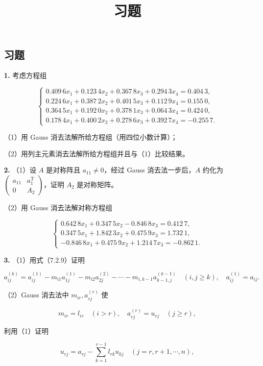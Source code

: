 \documentclass[
  10pt,
  fontset=fandol]{ctexart}
\title{习题}
\author{}
\date{}
\begin{document}
\maketitle

\subsection{习题}\label{ux4e60ux9898}

\textbf{1.} 考虑方程组

\[
\begin{cases}
0.409\,6x_1+0.123\,4x_2+0.367\,8x_3+0.294\,3x_4=0.404\,3,\\
0.224\,6x_1+0.387\,2x_2+0.401\,5x_3+0.112\,9x_4=0.155\,0,\\
0.364\,5x_1+0.192\,0x_2+0.378\,1x_3+0.064\,3x_4=0.424\,0,\\
0.178\,4x_1+0.400\,2x_2+0.278\,6x_3+0.392\,7x_4=-0.255\,7.
\end{cases}
\]

（1）用 Gauss 消去法解所给方程组（用四位小数计算）；

（2）用列主元素消去法解所给方程组并且与（1）比较结果。

\textbf{2.} （1）设 \(A\) 是对称阵且 \(a_{11}\neq0\)，经过 Gauss 消去法一步后，\(A\) 约化为 \(\begin{pmatrix}a_{11}&a_1^{\mathrm T}\\0&A_2\end{pmatrix}\)，证明 \(A_2\) 是对称矩阵。

（2）用 Gauss 消去法解对称方程组

\[
\begin{cases}
0.642\,8x_1+0.347\,5x_2-0.846\,8x_3=0.412\,7,\\
0.347\,5x_1+1.842\,3x_2+0.475\,9x_3=1.732\,1,\\
-0.846\,8x_1+0.475\,9x_2+1.214\,7x_3=-0.862\,1.
\end{cases}
\]

\textbf{3.} （1）用式（7.2.9）证明

\[
a_{ij}^{(k)}=a_{ij}^{(1)}-m_{i1}a_{1j}^{(1)}-m_{i2}a_{2j}^{(2)}-\cdots-m_{i,k-1}a_{k-1,j}^{(k-1)}
\quad(i,j\geqslant k),\quad a_{ij}^{(1)}=a_{ij}.
\]

（2）Gauss 消去法中 \(m_{ir},a_{rj}^{(r)}\) 使

\[
m_{ir}=l_{ir}\quad(i>r),\quad a_{rj}^{(r)}=u_{rj}\quad(j\geqslant r),
\]

利用（1）证明

\[
u_{rj}=a_{rj}-\sum_{k=1}^{r-1}l_{rk}u_{kj}\quad(j=r,r+1,\cdots,n),
\]
\end{document}
